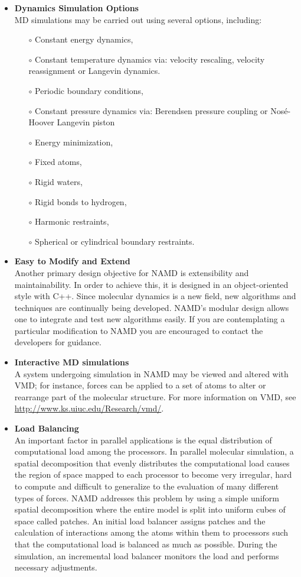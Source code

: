 \begin{itemize}
\item \textbf{Dynamics Simulation Options}\\
MD simulations may be carried out using several options, including:
\begin{itemize}
\item[$\circ$] Constant energy dynamics,
\item[$\circ$] Constant temperature dynamics via: velocity rescaling, velocity reassignment or Langevin dynamics.
\item[$\circ$] Periodic boundary conditions,
\item[$\circ$] Constant pressure dynamics via: Berendsen pressure coupling or Nos\'{e}-Hoover Langevin piston
\item[$\circ$] Energy minimization,
\item[$\circ$] Fixed atoms,
\item[$\circ$] Rigid waters,
\item[$\circ$] Rigid bonds to hydrogen,
\item[$\circ$] Harmonic restraints,
\item[$\circ$] Spherical or cylindrical boundary restraints.
\end{itemize}
\item \textbf{Easy to Modify and Extend}\\
Another primary design objective for NAMD is extensibility and maintainability. In order to achieve this, it is designed in an object-oriented style with C++. Since molecular dynamics is a new field, new algorithms and techniques are continually being developed. NAMD’s modular design allows one to integrate and test new algorithms easily. If you are contemplating a particular modification to NAMD you are encouraged to contact the developers for guidance.
\item \textbf{Interactive MD simulations}\\
A system undergoing simulation in NAMD may be viewed and altered with VMD; for instance, forces can be applied to a set of atoms to alter or rearrange part of the molecular structure. For more information on VMD, see \url{http://www.ks.uiuc.edu/Research/vmd/}.
\item \textbf{Load Balancing}\\
An important factor in parallel applications is the equal distribution of computational load among the processors. In parallel molecular simulation, a spatial decomposition that evenly distributes the computational load causes the region of space mapped to each processor to become very irregular, hard to compute and difficult to generalize to the evaluation of many different types of forces. NAMD addresses this problem by using a simple uniform spatial decomposition where the entire model is split into uniform cubes of space called patches. An initial load balancer assigns patches and the calculation of interactions among the atoms within them to processors such that the computational load is balanced as much as possible. During the simulation, an incremental load balancer monitors the load and performs necessary adjustments.
\end{itemize}

